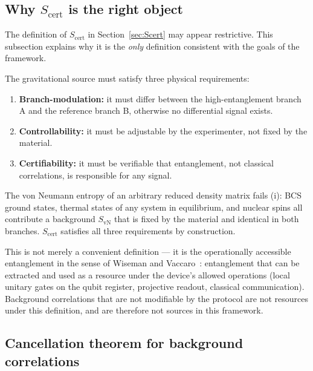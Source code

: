\documentclass[11pt]{article}
\theoremstyle{plain}
\theoremstyle{definition}
\theoremstyle{remark}
\begin{document}
\subsection{Why $S_{\mathrm{cert}}$ is the right object}
\label{sec:Scert-justification}

The definition of $S_{\mathrm{cert}}$ in Section~\ref{sec:Scert} may appear
restrictive.  This subsection explains why it is the \emph{only} definition
consistent with the goals of the framework.

The gravitational source must satisfy three physical requirements:
\begin{enumerate}[label=(\roman*),noitemsep]
  \item \textbf{Branch-modulation:} it must differ between the high-entanglement branch
    A and the reference branch B, otherwise no differential signal exists.
  \item \textbf{Controllability:} it must be adjustable by the experimenter, not fixed
    by the material.
  \item \textbf{Certifiability:} it must be verifiable that entanglement, not
    classical correlations, is responsible for any signal.
\end{enumerate}
The von Neumann entropy of an arbitrary reduced density matrix fails (i): BCS ground
states, thermal states of any system in equilibrium, and nuclear spins all contribute
a background $S_{\mathrm{vN}}$ that is fixed by the material and identical in both branches.
$S_{\mathrm{cert}}$ satisfies all three requirements by construction.

This is not merely a convenient definition --- it is the operationally accessible
entanglement in the sense of Wiseman and Vaccaro~\cite{Wiseman2003}: entanglement
that can be extracted and used as a resource under the device's allowed operations
(local unitary gates on the qubit register, projective readout, classical communication).
Background correlations that are not modifiable by the protocol are not resources
under this definition, and are therefore not sources in this framework.

\subsection{Cancellation theorem for background correlations}
\label{sec:cancel}
\end{document}

